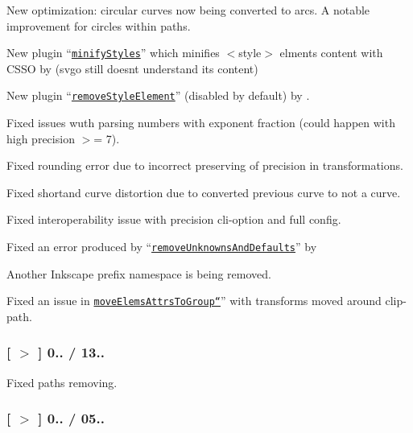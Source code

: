 \begin{DoxyItemize}
\item New optimization\+: circular curves now being converted to arcs. A notable improvement for circles within paths.
\item New plugin “\href{https://github.com/svg/svgo/blob/master/plugins/minifyStyles.js}{\tt minify\+Styles}” which minifies {\ttfamily $<$style$>$} elments content with C\+S\+SO by  (svgo still doesn\textquotesingle{}t understand its content)
\item New plugin “\href{https://github.com/svg/svgo/blob/master/plugins/removeStyleElement.js}{\tt remove\+Style\+Element}” (disabled by default) by .
\item Fixed issues wuth parsing numbers with exponent fraction (could happen with high precision $>$= 7).
\item Fixed rounding error due to incorrect preserving of precision in transformations.
\item Fixed shortand curve distortion due to converted previous curve to not a curve.
\item Fixed interoperability issue with {\ttfamily precision} cli-\/option and {\ttfamily full} config.
\item Fixed an error produced by “\href{https://github.com/svg/svgo/blob/master/plugins/removeUnknownsAndDefaults.js}{\tt remove\+Unknowns\+And\+Defaults}” by 
\item Another Inkscape prefix namespace is being removed.
\item Fixed an issue in \href{https://github.com/svg/svgo/blob/master/plugins/moveElemsAttrsToGroup“.js}{\tt move\+Elems\+Attrs\+To\+Group“}” with transforms moved around {\ttfamily clip-\/path}.
\end{DoxyItemize}

\subsubsection*{\mbox{[} \href{https://github.com/svg/svgo/tree/v0.5.6}{\tt $>$} \mbox{]} 0.. / 13..}


\begin{DoxyItemize}
\item Fixed paths removing.
\end{DoxyItemize}

\subsubsection*{\mbox{[} \href{https://github.com/svg/svgo/tree/v0.5.5}{\tt $>$} \mbox{]} 0.. / 05..}


